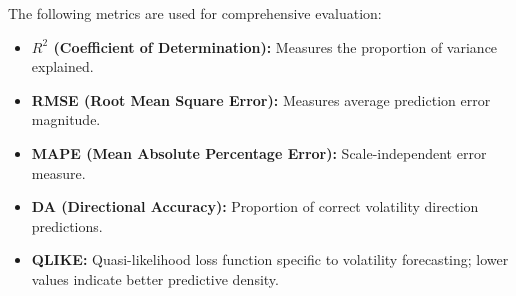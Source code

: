 The following metrics are used for comprehensive evaluation:

\begin{itemize}
    \item \textbf{$R^2$ (Coefficient of Determination):} Measures the proportion of variance explained.
    \item \textbf{RMSE (Root Mean Square Error):} Measures average prediction error magnitude.
    \item \textbf{MAPE (Mean Absolute Percentage Error):} Scale-independent error measure.
    \item \textbf{DA (Directional Accuracy):} Proportion of correct volatility direction predictions.
    \item \textbf{QLIKE:} Quasi-likelihood loss function specific to volatility forecasting; lower values indicate better predictive density.
\end{itemize}
